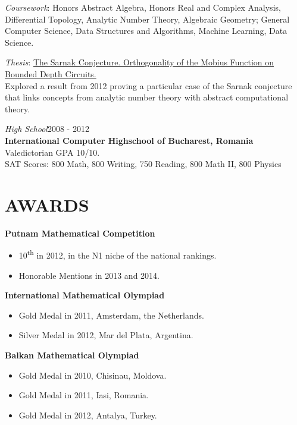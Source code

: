\documentclass[margin]{res}
\begin{document}
\begin{resume}
  {\sl Coursework\/}:  Honors Abstract Algebra, Honors Real and Complex Analysis, Differential Topology,
    Analytic Number Theory, Algebraic Geometry; General Computer Science, Data Structures and
    Algorithms, Machine Learning, Data Science.
  \vspace{-6pt}

  {\sl Thesis\/}: \href{http://math.harvard.edu/theses/senior/dragoi/dragoi.pdf}
  {The Sarnak Conjecture. Orthogonality of the Mobius Function on Bounded Depth Circuits.} \\
  Explored a result from 2012 proving a particular case of the Sarnak conjecture that links
  concepts from analytic number theory with abstract computational theory.
  \vspace{-6pt}

  {\sl High School}\hfill 2008 - 2012 \\
  \textbf{International Computer Highschool of Bucharest, Romania}\\
  Valedictorian GPA 10/10.\\
  SAT Scores: 800 Math, 800 Writing, 750 Reading, 800 Math II, 800 Physics
  \vspace{8pt}

  \section{AWARDS} \textbf{Putnam Mathematical Competition}
  \begin{itemize} \itemsep -2pt
    \item 10\textsuperscript{th} in 2012, in the N1 niche of the national rankings.
    \item Honorable Mentions in 2013 and 2014.
  \end{itemize}
  \textbf{International Mathematical Olympiad}
  \begin{itemize} \itemsep -1pt
    \item Gold Medal in 2011, Amsterdam, the Netherlands.
    \item Silver Medal in 2012, Mar del Plata, Argentina.
  \end{itemize}
  \textbf{Balkan Mathematical Olympiad}
  \begin{itemize} \itemsep -1pt
    \item Gold Medal in 2010, Chisinau, Moldova.
    \item Gold Medal in 2011, Iasi, Romania.
    \item Gold Medal in 2012, Antalya, Turkey.
  \end{itemize}
  \newpage


\end{resume}
\end{document}
